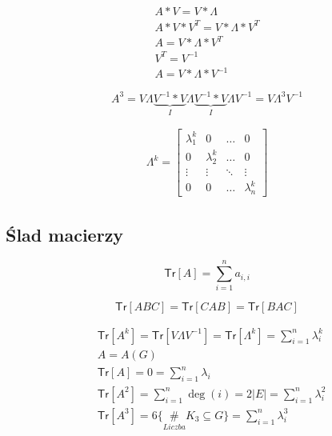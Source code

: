\begin{align*}
A*V=V*\Lambda \\
A*V*V^T=V*\Lambda *V^T\\
A=V*\Lambda *V^T\\
V^T=V^{-1}\\
A= V*\Lambda *V^{-1}
\end{align*}

$$A^3=V\Lambda \underbrace{V^{-1} * V}_I\Lambda \underbrace{V^{-1}* V}_I\Lambda V^{-1} = V\Lambda ^3V^{-1}$$

\begin{align*}
\Lambda ^k= \begin{bmatrix}
\lambda _1^k& 0 & \dots & 0\\
0 & \lambda _2^k & \dots & 0\\
\vdots & \vdots &\ddots & \vdots \\
0 & 0 & \dots & \lambda _n^k
\end{bmatrix}
\end{align*}

\subsection{Ślad macierzy}
$$\mathsf{Tr}[A]=\sum_{i=1}^n a_{i,i}$$
\begin{fact*}
$$\mathsf{Tr}[ABC]=\mathsf{Tr}[CAB]=\mathsf{Tr}[BAC]$$
\end{fact*}
\begin{align*}
&\mathsf{Tr}[A^k]=\mathsf{Tr}[V \Lambda V^{-1}]=\mathsf{Tr}[\Lambda ^k]=\sum_{i=1}^n\lambda_i^k\\
&A=A(G)\\
&\mathsf{Tr}[A]=0=\sum_{i=1}^n\lambda _i\\
&\mathsf{Tr}[A^2]=\sum_{i=1}^n\deg (i)=2|E|=\sum_{i=1}^n\lambda ^2_i\\
&\mathsf{Tr}[A^3]=6 \{\underset{Liczba}{\#} K_3 \subseteq G\}=\sum_{i=1}^n\lambda ^3_i
\end{align*}

